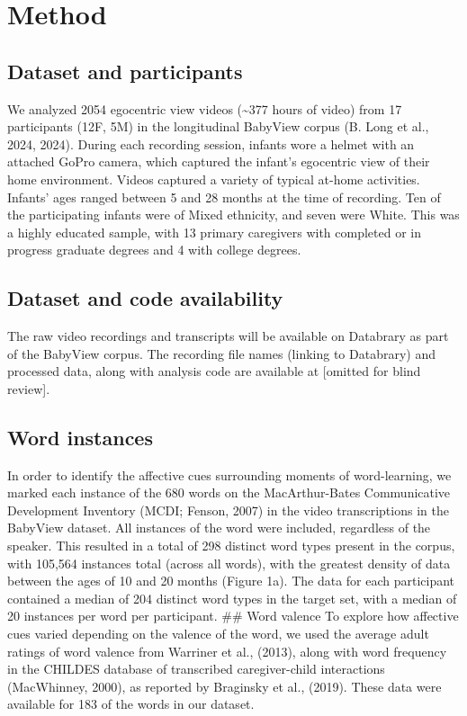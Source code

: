 \documentclass[10pt, letterpaper]{article}
\begin{document}
\section{Method}\label{method}

\subsection{Dataset and participants}\label{dataset-and-participants}

We analyzed 2054 egocentric view videos (\textasciitilde377 hours of
video) from 17 participants (12F, 5M) in the longitudinal BabyView
corpus (B. Long et al., 2024, 2024). During each recording session,
infants wore a helmet with an attached GoPro camera, which captured the
infant's egocentric view of their home environment. Videos captured a
variety of typical at-home activities. Infants' ages ranged between 5
and 28 months at the time of recording. Ten of the participating infants
were of Mixed ethnicity, and seven were White. This was a highly
educated sample, with 13 primary caregivers with completed or in
progress graduate degrees and 4 with college degrees.

\subsection{Dataset and code
availability}\label{dataset-and-code-availability}

The raw video recordings and transcripts will be available on Databrary
as part of the BabyView corpus. The recording file names (linking to
Databrary) and processed data, along with analysis code are available at
{[}omitted for blind review{]}.

\subsection{Word instances}\label{word-instances}

In order to identify the affective cues surrounding moments of
word-learning, we marked each instance of the 680 words on the
MacArthur-Bates Communicative Development Inventory (MCDI; Fenson, 2007)
in the video transcriptions in the BabyView dataset. All instances of
the word were included, regardless of the speaker. This resulted in a
total of 298 distinct word types present in the corpus, with 105,564
instances total (across all words), with the greatest density of data
between the ages of 10 and 20 months (Figure 1a). The data for each
participant contained a median of 204 distinct word types in the target
set, with a median of 20 instances per word per participant. \#\# Word
valence To explore how affective cues varied depending on the valence of
the word, we used the average adult ratings of word valence from
Warriner et al., (2013), along with word frequency in the CHILDES
database of transcribed caregiver-child interactions (MacWhinney, 2000),
as reported by Braginsky et al., (2019). These data were available for
183 of the words in our dataset.
\end{document}
